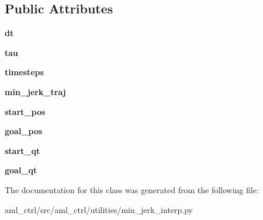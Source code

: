 \subsection*{Public Attributes}
\begin{DoxyCompactItemize}
\item 
\hypertarget{classaml__ctrl_1_1utilities_1_1min__jerk__interp_1_1_min_jerk_interp_a3cf50dd857ae275c6a9309c560a334f0}{}\label{classaml__ctrl_1_1utilities_1_1min__jerk__interp_1_1_min_jerk_interp_a3cf50dd857ae275c6a9309c560a334f0} 
{\bfseries dt}
\item 
\hypertarget{classaml__ctrl_1_1utilities_1_1min__jerk__interp_1_1_min_jerk_interp_abfbc4183bd40597d1f8ef549c8a954cd}{}\label{classaml__ctrl_1_1utilities_1_1min__jerk__interp_1_1_min_jerk_interp_abfbc4183bd40597d1f8ef549c8a954cd} 
{\bfseries tau}
\item 
\hypertarget{classaml__ctrl_1_1utilities_1_1min__jerk__interp_1_1_min_jerk_interp_a53f374cd9afb16fb0293c4f65987795d}{}\label{classaml__ctrl_1_1utilities_1_1min__jerk__interp_1_1_min_jerk_interp_a53f374cd9afb16fb0293c4f65987795d} 
{\bfseries timesteps}
\item 
\hypertarget{classaml__ctrl_1_1utilities_1_1min__jerk__interp_1_1_min_jerk_interp_a655ecaf3042fd23a9dea45fcac07c520}{}\label{classaml__ctrl_1_1utilities_1_1min__jerk__interp_1_1_min_jerk_interp_a655ecaf3042fd23a9dea45fcac07c520} 
{\bfseries min\+\_\+jerk\+\_\+traj}
\item 
\hypertarget{classaml__ctrl_1_1utilities_1_1min__jerk__interp_1_1_min_jerk_interp_a2154616a9adab36c591fc90b62ac66cc}{}\label{classaml__ctrl_1_1utilities_1_1min__jerk__interp_1_1_min_jerk_interp_a2154616a9adab36c591fc90b62ac66cc} 
{\bfseries start\+\_\+pos}
\item 
\hypertarget{classaml__ctrl_1_1utilities_1_1min__jerk__interp_1_1_min_jerk_interp_af33d73bed61d6eebe0ddbb1ca953a881}{}\label{classaml__ctrl_1_1utilities_1_1min__jerk__interp_1_1_min_jerk_interp_af33d73bed61d6eebe0ddbb1ca953a881} 
{\bfseries goal\+\_\+pos}
\item 
\hypertarget{classaml__ctrl_1_1utilities_1_1min__jerk__interp_1_1_min_jerk_interp_a1d7c1d1cc8b9b64922061d060d331d8a}{}\label{classaml__ctrl_1_1utilities_1_1min__jerk__interp_1_1_min_jerk_interp_a1d7c1d1cc8b9b64922061d060d331d8a} 
{\bfseries start\+\_\+qt}
\item 
\hypertarget{classaml__ctrl_1_1utilities_1_1min__jerk__interp_1_1_min_jerk_interp_a6aa537ca52a3e35e06ef582303e4501f}{}\label{classaml__ctrl_1_1utilities_1_1min__jerk__interp_1_1_min_jerk_interp_a6aa537ca52a3e35e06ef582303e4501f} 
{\bfseries goal\+\_\+qt}
\end{DoxyCompactItemize}


The documentation for this class was generated from the following file\+:\begin{DoxyCompactItemize}
\item 
aml\+\_\+ctrl/src/aml\+\_\+ctrl/utilities/min\+\_\+jerk\+\_\+interp.\+py\end{DoxyCompactItemize}
